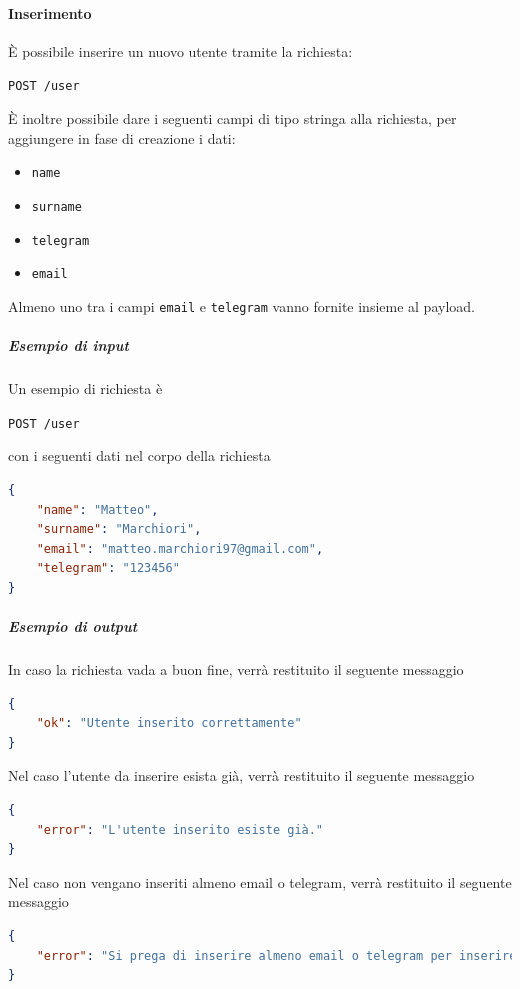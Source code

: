 \paragraph{Inserimento}
È possibile inserire un nuovo utente tramite la richiesta:
    \begin{center}
        \texttt{POST /user}
    \end{center}

È inoltre possibile dare i seguenti campi di tipo stringa alla richiesta, per aggiungere in fase di creazione i dati:
\begin{itemize}[noitemsep]
    \item \texttt{name}
    \item \texttt{surname}
    \item \texttt{telegram}
    \item \texttt{email}
\end{itemize}
Almeno uno tra i campi \texttt{email} e \texttt{telegram} vanno fornite insieme al payload.

    \subparagraph{Esempio di input}
    Un esempio di richiesta è
        \begin{center}
            \texttt{POST  /user}
        \end{center}
    con i seguenti dati nel corpo della richiesta
    \begin{lstlisting}[language = json]
{
    "name": "Matteo",
    "surname": "Marchiori",
    "email": "matteo.marchiori97@gmail.com",
    "telegram": "123456"
}
    \end{lstlisting}


    \subparagraph{Esempio di output}
    In caso la richiesta vada a buon fine, verrà restituito il seguente messaggio
    \begin{lstlisting}[language = json]
{
    "ok": "Utente inserito correttamente"
}
    \end{lstlisting}

    Nel caso l'utente da inserire esista già, verrà restituito il seguente messaggio
    \begin{lstlisting}[language = json]
{
    "error": "L'utente inserito esiste già."
}
    \end{lstlisting}

    Nel caso non vengano inseriti almeno email o telegram, verrà restituito il seguente messaggio
    \begin{lstlisting}[language = json]
{
    "error": "Si prega di inserire almeno email o telegram per inserire l'utente."
}
    \end{lstlisting}

